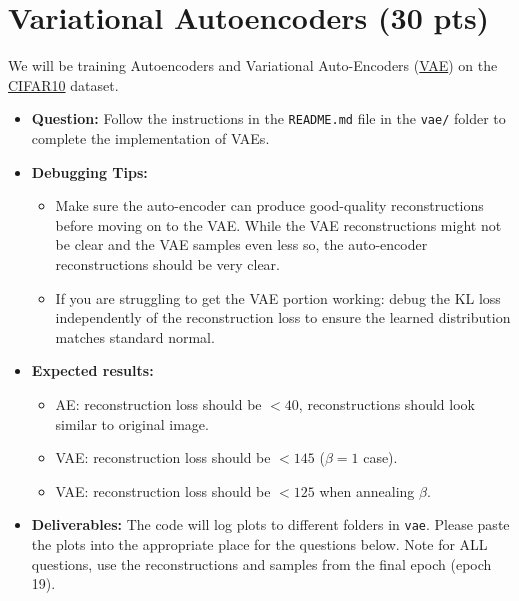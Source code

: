 \documentclass[11pt,addpoints,answers]{exam}
\numberwithin{equation}{section} %
\numberwithin{figure}{section} %
\numberwithin{table}{section} %
\begin{document}
\section{Variational Autoencoders (30 pts)}

We will be training Autoencoders and Variational Auto-Encoders (\href{https://arxiv.org/abs/1312.6114}{VAE}) on the \href{https://www.cs.toronto.edu/~kriz/cifar.html}{CIFAR10} dataset.

\begin{itemize}
\item \textbf{Question:} Follow the instructions in the \texttt{README.md} file in the \texttt{vae/} folder to complete the implementation of VAEs.
\item \textbf{Debugging Tips:}
    \begin{itemize}
        \item Make sure the auto-encoder can produce good-quality reconstructions before moving on to the VAE. 
        While the VAE reconstructions might not be clear and the VAE samples even less so, the auto-encoder reconstructions should be very clear.
        \item If you are struggling to get the VAE portion working: debug the KL loss independently of the reconstruction loss to ensure the learned distribution matches standard normal. 
    \end{itemize}
\item \textbf{Expected results:}
    \begin{itemize}
        \item AE: reconstruction loss should be $<40$, reconstructions should look similar to original image.
        \item VAE: reconstruction loss should be $< 145$ ($\beta=1$ case).
        \item VAE: reconstruction loss should be $< 125$ when annealing $\beta$.
    \end{itemize}
\item \textbf{Deliverables:} The code will log plots to different folders in \texttt{vae}. Please paste the plots into the appropriate place for the questions below. Note for ALL questions, use the reconstructions and samples from the final epoch (epoch 19). 
\end{itemize}
\newpage
\end{document}
